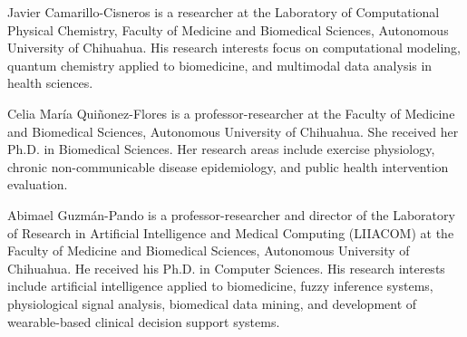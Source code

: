 \documentclass[journal,twoside,web]{ieeecolor}
\begin{document}
\begin{IEEEbiographynophoto}{Javier Camarillo-Cisneros} is a researcher at the Laboratory of Computational Physical Chemistry, Faculty of Medicine and Biomedical Sciences, Autonomous University of Chihuahua. His research interests focus on computational modeling, quantum chemistry applied to biomedicine, and multimodal data analysis in health sciences.
\end{IEEEbiographynophoto}

\begin{IEEEbiographynophoto}{Celia María Quiñonez-Flores} is a professor-researcher at the Faculty of Medicine and Biomedical Sciences, Autonomous University of Chihuahua. She received her Ph.D. in Biomedical Sciences. Her research areas include exercise physiology, chronic non-communicable disease epidemiology, and public health intervention evaluation.
\end{IEEEbiographynophoto}

\begin{IEEEbiographynophoto}{Abimael Guzmán-Pando} is a professor-researcher and director of the Laboratory of Research in Artificial Intelligence and Medical Computing (LIIACOM) at the Faculty of Medicine and Biomedical Sciences, Autonomous University of Chihuahua. He received his Ph.D. in Computer Sciences. His research interests include artificial intelligence applied to biomedicine, fuzzy inference systems, physiological signal analysis, biomedical data mining, and development of wearable-based clinical decision support systems.
\end{IEEEbiographynophoto}
\end{document}
